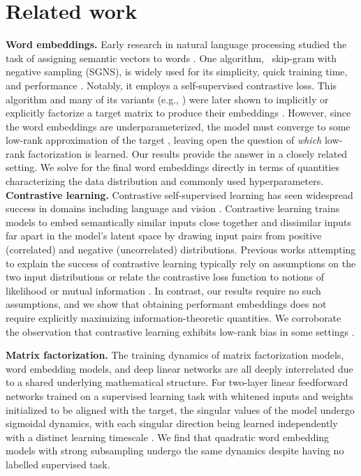 \section{Related work}

\textbf{Word embeddings.} Early research in natural language processing studied the task of assigning semantic vectors to words \citep{bengio2000neural, almeida2019word}. One algorithm, \wtv\ skip-gram with negative sampling (SGNS), is widely used for its simplicity, quick training time, and performance \citep{mikolov2013distributed, levy2015improving}. Notably, it employs a self-supervised contrastive loss.
This algorithm and many of its variants (e.g., \cite{pennington2014glove}) were later shown to implicitly or explicitly factorize a target matrix to produce their embeddings \citep{levy2014neural}. However, since the word embeddings are underparameterized, the model must converge to some low-rank approximation of the target \citep{arora2016latent}, leaving open the question of \textit{which} low-rank factorization is learned.
Our results provide the answer in a closely related setting. We solve for the final word embeddings directly in terms of quantities characterizing the data distribution and commonly used hyperparameters.
\textbf{Contrastive learning.} Contrastive self-supervised learning has seen widespread success in domains including language \citep{mikolov2013distributed,oord2018representation,clark2020electra} and vision \citep{oord2018representation,bachman2019learning,chen2020simple}.
Contrastive learning trains models to embed semantically similar inputs close together and dissimilar inputs far apart in the model's latent space by drawing input pairs from positive (correlated) and negative (uncorrelated) distributions.
Previous works attempting to explain the success of contrastive learning typically rely on assumptions on the two input distributions \citep{saunshi2019theoretical,wang2020understanding,haochen2021provable} or relate the contrastive loss function to notions of likelihood or mutual information \citep{gutmann2010noise,mikolov2013distributed,oord2018representation,bachman2019learning}. In contrast, our results require no such assumptions, and we show that obtaining performant embeddings does not require explicitly maximizing information-theoretic quantities. We corroborate the observation that contrastive learning exhibits low-rank bias in some settings \citep{jing2021understanding,simon2023stepwise}.

\textbf{Matrix factorization.} The training dynamics of matrix factorization models, word embedding models, and deep linear networks are all deeply interrelated due to a shared underlying mathematical structure. For two-layer linear feedforward networks trained on a supervised learning task with whitened inputs and weights initialized to be aligned with the target, the singular values of the model undergo sigmoidal dynamics, with each singular direction being learned independently with a distinct learning timescale \citep{saxe2014exact,saxe2019mathematical,gidel2019implicit,atanasov2022neural,domine2023exact}. We find that quadratic word embedding models with strong subsampling undergo the same dynamics despite having no labelled supervised task.

